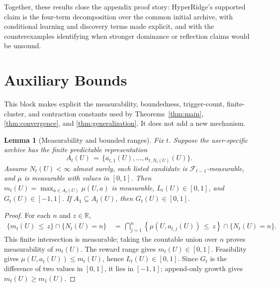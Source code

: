 \documentclass{article} %
\newtheorem{lemma}[theorem]{Lemma}
\begin{document}
\begin{table}[h]
\end{table}

Together, these results close the appendix proof story: HyperRidge's supported claim is the four-term decomposition over the common initial archive, with conditional learning and discovery terms made explicit, and with the counterexamples identifying when stronger dominance or reflection claims would be unsound.

\section{Auxiliary Bounds}

\label{app:proofs-extra}

This block makes explicit the measurability, boundedness, trigger-count,
finite-cluster, and contraction constants used by
Theorems~\ref{thm:main}, \ref{thm:convergence}, and
\ref{thm:generalization}. It does not add a new mechanism.

\begin{lemma}[Measurability and bounded ranges]
\label{lem:measurable-bounded-ranges}
Fix \(t\).  Suppose the user-specific archive has the finite predictable
representation
\begin{equation}
A_t(U)
\,=\,
\{a_{t,1}(U),\ldots,a_{t,N_t(U)}(U)\}.
\end{equation}
Assume \(N_t(U)<\infty\) almost surely, each listed candidate is
\(\mathcal F_{t-1}\)-measurable, and \(\mu\) is measurable with values in
\([0,1]\).  Then \(m_t(U)=\max_{a\in A_t(U)}\mu(U,a)\) is measurable,
\(L_t(U)\in[0,1]\), and \(G_t(U)\in[-1,1]\).  If
\(A_1\subseteq A_t(U)\), then \(G_t(U)\in[0,1]\).
\end{lemma}

\begin{proof}
For each \(n\) and \(z\in\mathbb R\),
\begin{equation}
\begin{aligned}
\{m_t(U)\,\le\, z\}\cap\{N_t(U)=n\}
&\,=\,
\bigcap_{j=1}^{n}
\left\{
\mu\!\left(U,a_{t,j}(U)\right)\,\le\, z
\right\}
\cap
\{N_t(U)=n\}.
\end{aligned}
\end{equation}
This finite intersection is measurable; taking the countable union over
\(n\) proves measurability of \(m_t(U)\).  The reward range gives
\(m_t(U)\in[0,1]\).  Feasibility gives
\(\mu(U,a_t(U))\leq m_t(U)\), hence \(L_t(U)\in[0,1]\).  Since \(G_t\) is the
difference of two values in \([0,1]\), it lies in \([-1,1]\); append-only
growth gives \(m_t(U)\geq m_1(U)\).
\end{proof}
\end{document}
